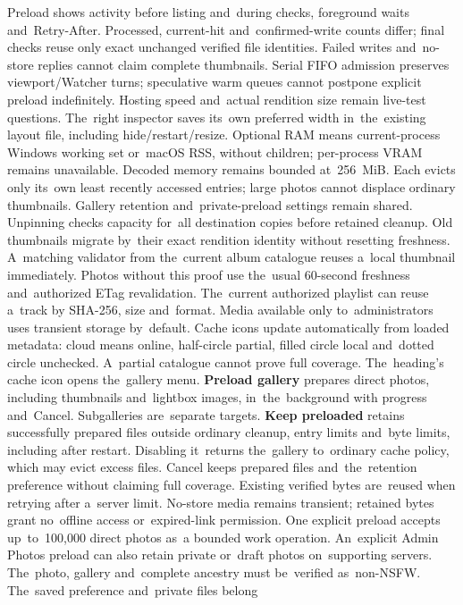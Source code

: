 \documentclass[11pt,a4paper]{article}
\newcommand{\ui}[1]{\textbf{#1}}
\begin{document}
Preload shows activity before listing and~during checks, foreground waits
and~Retry-After. Processed, current-hit and~confirmed-write counts differ;
final checks reuse only exact unchanged verified file identities.
Failed writes and~no-store replies cannot claim complete thumbnails.
Serial FIFO admission preserves viewport/Watcher turns; speculative warm
queues cannot postpone explicit preload indefinitely. Hosting speed and~actual
rendition size remain live-test questions. The~right inspector saves its~own
preferred width in~the~existing layout file, including hide/restart/resize.
Optional RAM means current-process Windows working set or~macOS RSS, without children;
per-process VRAM remains unavailable. Decoded memory remains bounded at~256~MiB.
Each evicts only its~own least recently accessed entries; large photos cannot
displace ordinary thumbnails. Gallery retention and~private-preload settings
remain shared. Unpinning checks capacity for~all destination copies before
retained cleanup. Old thumbnails migrate by~their exact rendition identity
without resetting freshness. A~matching validator from the~current album catalogue
reuses a~local thumbnail immediately. Photos without this proof use the~usual
60-second freshness and~authorized ETag revalidation. The~current authorized
playlist can reuse a~track by SHA-256, size and~format. Media available
only to~administrators uses transient storage by~default.
Cache icons update automatically from loaded metadata: cloud means online,
half-circle partial, filled circle local and~dotted circle unchecked.
A~partial catalogue cannot prove full coverage. The~heading's cache icon
opens the~gallery menu.
\ui{Preload gallery} prepares direct photos, including thumbnails and~lightbox
images, in~the~background with progress and~Cancel. Subgalleries are~separate
targets. \ui{Keep preloaded} retains successfully prepared files outside
ordinary cleanup, entry limits and~byte limits, including after restart.
Disabling it~returns the~gallery to~ordinary cache policy, which may evict
excess files. Cancel keeps prepared files and~the~retention preference without
claiming full coverage. Existing verified bytes are~reused when retrying after
a~server limit. No-store media remains transient; retained bytes grant
no~offline access or~expired-link permission. One explicit preload accepts
up~to~100,000 direct photos as~a bounded work operation.
An~explicit Admin Photos preload can also retain private or~draft photos
on~supporting servers. The~photo, gallery and~complete ancestry must
be~verified as~non-NSFW. The~saved preference and~private files belong
\end{document}
